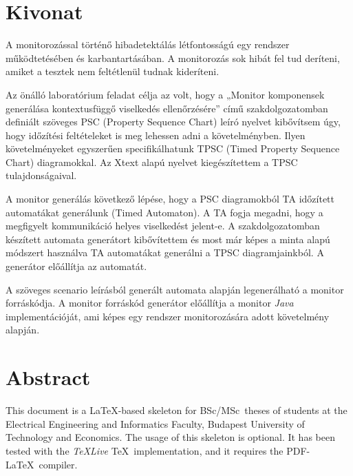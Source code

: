 \setcounter{page}{1}

\selecthungarian

\chapter*{Kivonat}

A monitorozással történő hibadetektálás létfontosságú egy rendszer működtetésében és karbantartásában. A monitorozás sok hibát fel tud deríteni, amiket a tesztek nem feltétlenül tudnak kideríteni.

Az önálló laboratórium feladat célja az volt, hogy a „Monitor komponensek generálása kontextusfüggő viselkedés ellenőrzésére” című szakdolgozatomban definiált szöveges PSC (Property Sequence Chart) leíró nyelvet kibővítsem úgy, hogy időzítési feltételeket is meg lehessen adni a követelményben. Ilyen követelményeket egyszerűen specifikálhatunk TPSC (Timed Property Sequence Chart) diagramokkal. Az Xtext alapú nyelvet kiegészítettem a TPSC tulajdonságaival.

A monitor generálás következő lépése, hogy a PSC diagramokból TA időzített automatákat generálunk (Timed Automaton). A TA fogja megadni, hogy a megfigyelt kommunikáció helyes viselkedést jelent-e. A szakdolgozatomban készített automata generátort kibővítettem és most már képes a minta alapú módszert használva TA automatákat generálni a TPSC diagramjainkból. A generátor előállítja az automatát.

A szöveges scenario leírásból generált automata alapján legenerálható a monitor forráskódja. A monitor forráskód generátor előállítja a monitor \textit{Java} implementációját, ami képes egy rendszer monitorozására adott követelmény alapján.



\vfill
\selectenglish


\chapter*{Abstract}

This document is a \LaTeX-based skeleton for BSc/MSc~theses of students at the Electrical Engineering and Informatics Faculty, Budapest University of Technology and Economics. The usage of this skeleton is optional. It has been tested with the \emph{TeXLive} \TeX~implementation, and it requires the PDF-\LaTeX~compiler.


\vfill
\selectthesislanguage

\setcounter{romanPage}{\value{page}}
